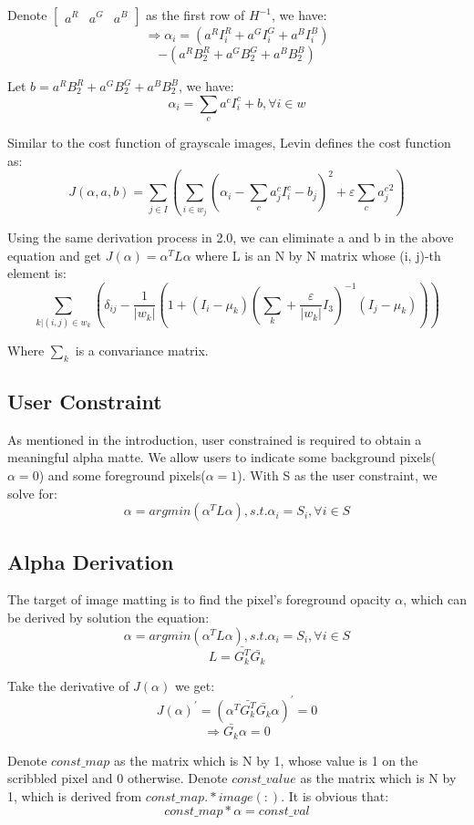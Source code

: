 \documentclass[11pt,letterpaper]{article}
\begin{document}
Denote $\begin{bmatrix} a^R & a^G & a^B \end{bmatrix}$ as the first row of $H^{-1}$, we have: 
$$\Rightarrow \alpha_i = 
(a^RI_i^R + a^GI_i^G + a^BI_i^B) $$
$$-(a^RB_2^R + a^GB_2^G + a^BB_2^B)$$

Let $b = a^RB_2^R + a^GB_2^G + a^BB_2^B$, we have:
$$\alpha_i = \sum_{c}a^cI_i^c + b, \forall i \in w$$

Similar to the cost function of gray­scale images, Levin defines the cost function as:
$$J(\alpha, a, b) = \sum_{j \in I}(\sum_{i \in w_j}(\alpha_i - \sum_c a_j^c I_i^c-b_j)^2+\varepsilon \sum_{c}{a_j^c}^2)$$

Using the same derivation process in 2.0, we can eliminate a and b in the above equation and get $J(\alpha) = \alpha^T L \alpha$ where L is an N by N matrix whose (i, j)-th element is:
$$\sum_{k|(i,j) \in w_k} (\delta_{ij} - \frac{1}{|w_k|}(1 + (I_i - \mu_k)(\sum_k + \frac{\varepsilon}{|w_k|}I_3)^{-1}(I_j - \mu_k)))$$

Where $\sum_k$ is a convariance matrix.
\subsection{User Constraint}
As mentioned in the introduction, user constrained is required to obtain a meaningful alpha matte. We allow users to indicate some background pixels($\alpha = 0$) and some foreground pixels($\alpha = 1$). With S as the user constraint, we solve for:
$$\alpha = argmin(\alpha^T L \alpha), s.t.\alpha_i = S_i, \forall i \in S $$

\subsection{Alpha Derivation}
The target of image matting is to find the pixel’s foreground opacity $\alpha$, which can be derived by solution the equation:
$$\alpha = argmin(\alpha^T L \alpha), s.t.\alpha_i = S_i, \forall i \in S $$
$$L = \bar{G_k^T}\bar{G_k}$$

Take the derivative of $J(\alpha)$ we get:
$$J(\alpha)^{'} = (\alpha^T \bar{G_k^T} \bar{G_k} \alpha)^{'} = 0$$
$$\Rightarrow \bar{G_k} \alpha = 0$$

Denote $const\_map$ as the matrix which is N by 1, whose value is 1 on the scribbled pixel and 0 otherwise. Denote $const\_value$ as the matrix which is N by 1, which is derived from $const\_map .* image(:)$. It is obvious that:
$$const\_map * \alpha = const\_val$$
\end{document}
